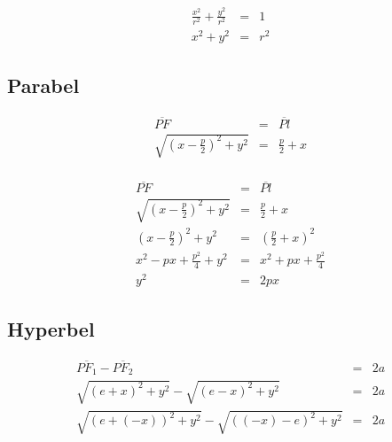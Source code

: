 \begin{frame}
\begin{displaymath}
	\begin{array}{rcl}
		\frac{x^2}{r^2} + \frac{y^2}{r^2} &=& 1\\
		x^2 + y^2 &=& r^2
	\end{array}
\end{displaymath}
\end{frame}

\subsection{Parabel}
\begin{frame}
\begin{figure}[h]
	\centering
		\resizebox{.5\linewidth}{!}{
			
		}
\end{figure}
\begin{displaymath}
	\begin{array}{rcl}
		\overline{PF} &=& \overline{Pl}\\
		\sqrt{\left(x-\frac{p}{2}\right)^2+y^2} &=& \frac{p}{2} + x\\
	\end{array}
\end{displaymath}
\end{frame}

\begin{frame}
\begin{displaymath}
	\begin{array}{rcl}
		\overline{PF} &=& \overline{Pl}\\
		\sqrt{\left(x-\frac{p}{2}\right)^2+y^2} &=& \frac{p}{2} + x\\
		\left(x-\frac{p}{2}\right)^2+y^2 &=& \left(\frac{p}{2} + x\right)^2\\
		x^2 - px + \frac{p^2}{4} + y^2 &=& x^2 + px + \frac{p^2}{4}\\
		y^2 &=& 2px
	\end{array}
\end{displaymath}
\end{frame}

\subsection{Hyperbel}
\begin{frame}
\begin{figure}[h]
	\centering
		\resizebox{.5\linewidth}{!}{
			
		}
\end{figure}
\begin{displaymath}
	\begin{array}{rcl}
		\overline{{PF}_1} - \overline{{PF}_2} & = & 2a\\
		\sqrt{{(e+x)}^2 + y^2} - \sqrt{{(e-x)}^2 + y^2} & = & 2a\\
		\sqrt{{(e+(-x))}^2 + y^2} - \sqrt{{((-x)-e)}^2 + y^2} & = & 2a\\
	\end{array}
\end{displaymath}
\end{frame}

